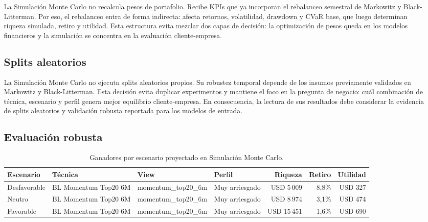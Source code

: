 La Simulaci\'on Monte Carlo no recalcula pesos de portafolio. Recibe KPIs que ya
incorporan el rebalanceo semestral de Markowitz y Black-Litterman. Por eso, el
rebalanceo entra de forma indirecta: afecta retornos, volatilidad, drawdown y
CVaR base, que luego determinan riqueza simulada, retiro y utilidad. Esta
estructura evita mezclar dos capas de decisi\'on: la optimizaci\'on de pesos queda
en los modelos financieros y la simulaci\'on se concentra en la evaluaci\'on
cliente-empresa.

\subsection*{Splits aleatorios}

La Simulaci\'on Monte Carlo no ejecuta splits aleatorios propios. Su robustez
temporal depende de los insumos previamente validados en Markowitz y
Black-Litterman. Esta decisi\'on evita duplicar experimentos y mantiene el foco
en la pregunta de negocio: cu\'al combinaci\'on de t\'ecnica, escenario y perfil
genera mejor equilibrio cliente-empresa. En consecuencia, la lectura de sus
resultados debe considerar la evidencia de splits aleatorios y validaci\'on
robusta reportada para los modelos de entrada.

\subsection*{Evaluaci\'on robusta}

\begin{table}[H]
\centering
\caption{Ganadores por escenario proyectado en Simulaci\'on Monte Carlo.}
\label{tab:anexo4_mc_robusta}
\small
\begin{adjustbox}{max width=\textwidth}
\begin{tabular}{llllrrr}
\toprule
Escenario & T\'ecnica & View & Perfil & Riqueza & Retiro & Utilidad \\
\midrule
Desfavorable & BL Momentum Top20 6M & momentum\_top20\_6m & Muy arriesgado & USD 5\,009 & 8,8\% & USD 327 \\
Neutro & BL Momentum Top20 6M & momentum\_top20\_6m & Muy arriesgado & USD 8\,974 & 3,1\% & USD 474 \\
Favorable & BL Momentum Top20 6M & momentum\_top20\_6m & Muy arriesgado & USD 15\,451 & 1,6\% & USD 690 \\
\bottomrule
\end{tabular}
\end{adjustbox}
\end{table}

